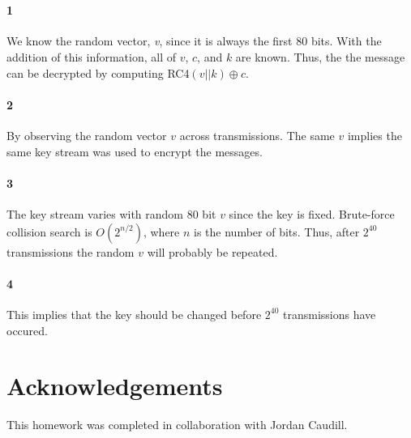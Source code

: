\documentclass[letterpaper]{article}
\begin{document}
\section{}
\paragraph{1}
  We know the random vector, \textit{v}, since it is always the first 80 bits. With the addition of this  information, all of $v$, $c$, and $k$ are known. Thus, the the message can be decrypted by computing RC4$(v||k) \oplus c$.

\paragraph{2}
  By observing the random vector $v$ across transmissions. The same $v$ implies the same key stream was used to encrypt the messages.

\paragraph{3}
  The key stream varies with random 80 bit $v$ since the key is fixed. Brute-force collision search is $O(2^{n/2})$, where $n$ is the number of bits. Thus, after $2^40$ transmissions the random $v$ will probably be repeated.

\paragraph{4} 
  This implies that the key should be changed before $2^{40}$ transmissions have occured.

\section*{Acknowledgements}
This homework was completed in collaboration with Jordan Caudill.
\end{document}
